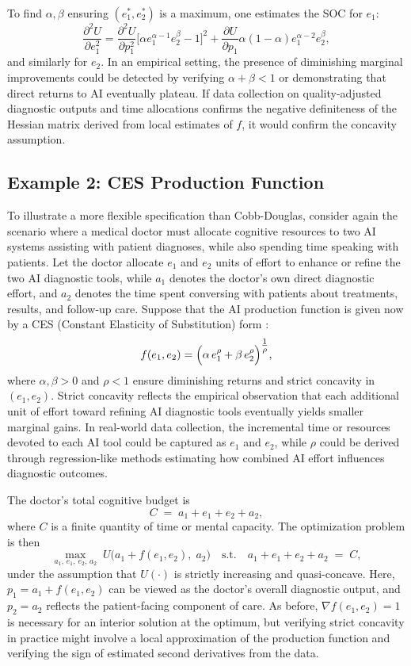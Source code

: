 To find $\alpha,\beta$ ensuring $(e^*_1,e^*_2)$ is a maximum, one estimates the SOC for $e_1$:
\[
\frac{\partial^2 U}{\partial e_1^2}
=\frac{\partial^2 U}{\partial p_1^2}\bigl[\alpha e_1^{\alpha-1}e_2^{\beta}-1\bigr]^2
+\frac{\partial U}{\partial p_1}\alpha(1-\alpha)e_1^{\alpha-2}e_2^\beta,
\]
and similarly for $e_2$. In an empirical setting, the presence of diminishing marginal improvements could be detected by verifying $\alpha+\beta<1$ or demonstrating that direct returns to AI eventually plateau. If data collection on quality-adjusted diagnostic outputs and time allocations confirms the negative definiteness of the Hessian matrix derived from local estimates of $f$, it would confirm the concavity assumption.

\subsection{Example 2: CES Production Function}
To illustrate a more flexible specification than Cobb-Douglas, consider again the scenario where a medical doctor must allocate cognitive resources to two AI systems assisting with patient diagnoses, while also spending time speaking with patients. Let the doctor allocate $e_1$ and $e_2$ units of effort to enhance or refine the two AI diagnostic tools, while $a_1$ denotes the doctor’s own direct diagnostic effort, and $a_2$ denotes the time spent conversing with patients about treatments, results, and follow-up care. Suppose that the AI production function is given now by a CES (Constant Elasticity of Substitution) form \citep{arrow1961capital}:
\[
f(e_1, e_2)
=
\Bigl(\alpha\,e_1^\rho + \beta\,e_2^\rho\Bigr)^{\tfrac{1}{\rho}},
\]
where $\alpha, \beta > 0$ and $\rho < 1$ ensure diminishing returns and strict concavity in $(e_1,e_2)$. Strict concavity reflects the empirical observation that each additional unit of effort toward refining AI diagnostic tools eventually yields smaller marginal gains. In real-world data collection, the incremental time or resources devoted to each AI tool could be captured as $e_1$ and $e_2$, while $\rho$ could be derived through regression-like methods estimating how combined AI effort influences diagnostic outcomes.

The doctor’s total cognitive budget is
\[
C \;=\; a_1 + e_1 + e_2 + a_2,
\]
where $C$ is a finite quantity of time or mental capacity. The optimization problem is then
\[
\max_{a_1,\, e_1,\, e_2,\, a_2}
\; U\bigl(a_1 + f(e_1, e_2),\; a_2\bigr)
\quad
\text{s.t.}
\quad
a_1 + e_1 + e_2 + a_2 \;=\; C,
\]
under the assumption that $U(\cdot)$ is strictly increasing and quasi-concave. Here, $p_1 = a_1 + f(e_1, e_2)$ can be viewed as the doctor’s overall diagnostic output, and $p_2 = a_2$ reflects the patient-facing component of care. As before, $\nabla f(e_1, e_2)=1$ is necessary for an interior solution at the optimum, but verifying strict concavity in practice might involve a local approximation of the production function and verifying the sign of estimated second derivatives from the data.

